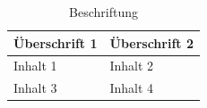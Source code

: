 \begin{table}[H]
  \centering
  \begin{tabularx}{\textwidth}{@{} L L @{}}
    \toprule
    \textbf{Überschrift 1} & \textbf{Überschrift 2} \\
    \midrule
    Inhalt 1               & Inhalt 2               \\
    \addlinespace
    Inhalt 3               & Inhalt 4               \\
    \bottomrule
  \end{tabularx}
  \caption{Beschriftung}
  \label{tab:tabfull}
\end{table}